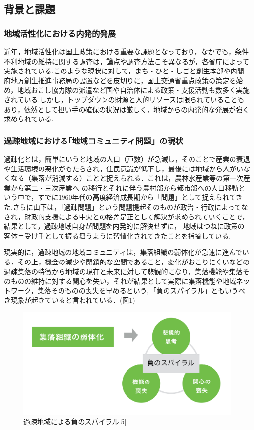 \documentclass[a4paper]{jsarticle}
\begin{document}
\subsection{背景と課題}
\subsubsection{地域活性化における内発的発展}
近年，地域活性化は国土政策における重要な課題となっており，なかでも，条件不利地域の維持に関する調査は，論点や調査方法こそ異なるが，各省庁によって実施されている.このような現状に対して，まち・ひと・しごと創生本部や内閣府地方創生推進事務局の設置などを皮切りに，国土交通省重点政策\cite{2}の策定を始め，地域おこし協力隊の派遣など国や自治体による政策・支援活動も数多く実施されている.しかし，トップダウンの財源と人的リソースは限られていることもあり，依然として担い手の確保の状況は厳しく，地域からの内発的な発展が強く求められている.
\subsubsection{過疎地域における｢地域コミュニティ問題」の現状}
過疎化とは，簡単にいうと地域の人口（戸数）が急減し，そのことで産業の衰退や生活環境の悪化がもたらされ，住民意識が低下し，最後には地域から人がいなくなる（集落が消滅する）ことと捉えられる．\cite{3}これは，農林水産業等の第一次産業から第二・三次産業へ の移行とそれに伴う農村部から都市部への人口移動という中で，すでに1960年代の高度経済成長期から「問題」として捉えられてきた.\cite{4}さらに山下は，「過疎問題」という問題提起そのものが政治・行政によってなされ，財政的支援による中央との格差是正として解決が求められていくことで，結果として，過疎地域自身が問題を内発的に解決せずに， 地域はつねに政策の客体＝受け手として振る舞うように習慣化されてきたことを指摘している.\cite{5}\par
現実的に，過疎地域の地域コミュニティは，集落組織の弱体化が急速に進んでいる．その上，機会の減少や閉鎖的な空間であること，変化がおこりにくいなどの過疎集落の特徴から地域の現在と未来に対して悲観的になり，集落機能や集落そのものの維持に対する関心を失い，それが結果として実際に集落機能や地域ネットワーク，集落そのものの喪失を早めるという，「負のスパイラル」ともいうべき現象が起きていると言われている．(図1)\cite{6}\par
\begin{figure}[H]
  \begin{center}
    \includegraphics[width=1.0\hsize]{./images/17.png}
    \caption{過疎地域による負のスパイラル[5]}
    \label{fig:tmu_hino}
  \end{center}
\end{figure}
\end{document}
